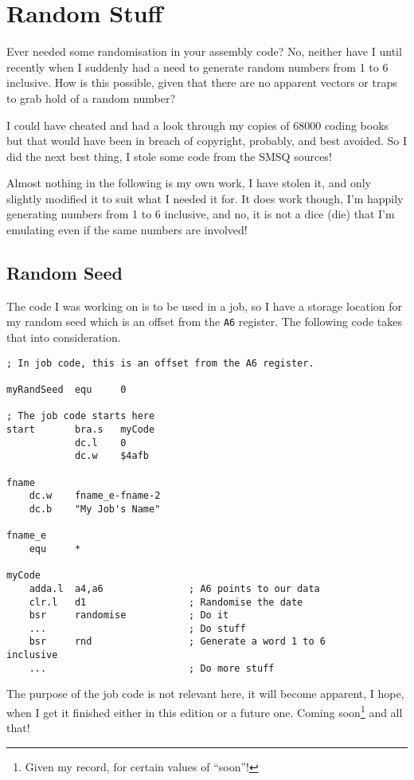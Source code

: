 \chapter{Random Stuff}

Ever needed some randomisation in your assembly code? No, neither
have I until recently when I suddenly had a need to generate random
numbers from 1 to 6 inclusive. How is this possible, given that there
are no apparent vectors or traps to grab hold of a random number?

I could have cheated and had a look through my copies of 68000 coding
books \textendash{} but that would have been in breach of copyright,
probably, and best avoided. So I did the next best thing, I stole
some code from the SMSQ sources!

Almost nothing in the following is my own work, I have stolen it,
and only slightly modified it to suit what I needed it for. It does
work though, I'm happily generating numbers from 1 to 6 inclusive,
and no, it is not a dice (die) that I'm emulating even if the same
numbers are involved!

\section{Random Seed}

The code I was working on is to be used in a job, so I have a storage
location for my random seed which is an offset from the \lstinline!A6!
register. The following code takes that into consideration.

\begin{lstlisting}[caption={The random seed},firstnumber=1]
; In job code, this is an offset from the A6 register.

myRandSeed  equ     0

; The job code starts here
start       bra.s   myCode
            dc.l    0
            dc.w    $4afb

fname
    dc.w    fname_e-fname-2
    dc.b    "My Job's Name"

fname_e
    equ     *

myCode
    adda.l  a4,a6               ; A6 points to our data
    clr.l   d1                  ; Randomise the date
    bsr     randomise           ; Do it
    ...                         ; Do stuff
    bsr     rnd                 ; Generate a word 1 to 6
inclusive
    ...                         ; Do more stuff
\end{lstlisting}

The purpose of the job code is not relevant here, it will become apparent,
I hope, when I get it finished \textendash{} either in this edition
or a future one. Coming soon\footnote{Given my record, for certain values of ``soon''!}
and all that!

